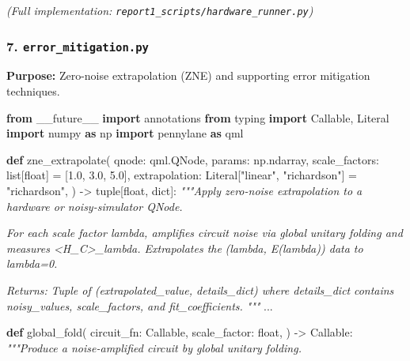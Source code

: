 \documentclass[
  11pt,
]{report}
\newenvironment{Shaded}{}{}
\newcommand{\BuiltInTok}[1]{\textcolor[rgb]{0.00,0.50,0.00}{#1}}
\newcommand{\CommentTok}[1]{\textcolor[rgb]{0.38,0.63,0.69}{\textit{#1}}}
\newcommand{\FloatTok}[1]{\textcolor[rgb]{0.25,0.63,0.44}{#1}}
\newcommand{\ImportTok}[1]{\textcolor[rgb]{0.00,0.50,0.00}{\textbf{#1}}}
\newcommand{\KeywordTok}[1]{\textcolor[rgb]{0.00,0.44,0.13}{\textbf{#1}}}
\newcommand{\NormalTok}[1]{#1}
\newcommand{\OperatorTok}[1]{\textcolor[rgb]{0.40,0.40,0.40}{#1}}
\newcommand{\StringTok}[1]{\textcolor[rgb]{0.25,0.44,0.63}{#1}}
\begin{document}
\emph{(Full implementation:
\texttt{report1\_scripts/hardware\_runner.py})}

\subsubsection{\texorpdfstring{7.
\texttt{error\_mitigation.py}}{7. error\_mitigation.py}}\label{error_mitigation.py}

\textbf{Purpose:} Zero-noise extrapolation (ZNE) and supporting error
mitigation techniques.

\begin{Shaded}
\begin{Highlighting}[]
\ImportTok{from}\NormalTok{ \_\_future\_\_ }\ImportTok{import}\NormalTok{ annotations}
\ImportTok{from}\NormalTok{ typing }\ImportTok{import}\NormalTok{ Callable, Literal}
\ImportTok{import}\NormalTok{ numpy }\ImportTok{as}\NormalTok{ np}
\ImportTok{import}\NormalTok{ pennylane }\ImportTok{as}\NormalTok{ qml}


\KeywordTok{def}\NormalTok{ zne\_extrapolate(}
\NormalTok{    qnode: qml.QNode,}
\NormalTok{    params: np.ndarray,}
\NormalTok{    scale\_factors: }\BuiltInTok{list}\NormalTok{[}\BuiltInTok{float}\NormalTok{] }\OperatorTok{=}\NormalTok{ [}\FloatTok{1.0}\NormalTok{, }\FloatTok{3.0}\NormalTok{, }\FloatTok{5.0}\NormalTok{],}
\NormalTok{    extrapolation: Literal[}\StringTok{"linear"}\NormalTok{, }\StringTok{"richardson"}\NormalTok{] }\OperatorTok{=} \StringTok{"richardson"}\NormalTok{,}
\NormalTok{) }\OperatorTok{{-}\textgreater{}} \BuiltInTok{tuple}\NormalTok{[}\BuiltInTok{float}\NormalTok{, }\BuiltInTok{dict}\NormalTok{]:}
    \CommentTok{"""Apply zero{-}noise extrapolation to a hardware or noisy{-}simulator QNode.}

\CommentTok{    For each scale factor lambda, amplifies circuit noise via global}
\CommentTok{    unitary folding and measures \textless{}H\_C\textgreater{}\_lambda. Extrapolates the}
\CommentTok{    (lambda, E(lambda)) data to lambda=0.}

\CommentTok{    Returns:}
\CommentTok{        Tuple of (extrapolated\_value, details\_dict) where details\_dict}
\CommentTok{        contains \textquotesingle{}noisy\_values\textquotesingle{}, \textquotesingle{}scale\_factors\textquotesingle{}, and \textquotesingle{}fit\_coefficients\textquotesingle{}.}
\CommentTok{    """}
\NormalTok{    ...}


\KeywordTok{def}\NormalTok{ global\_fold(}
\NormalTok{    circuit\_fn: Callable,}
\NormalTok{    scale\_factor: }\BuiltInTok{float}\NormalTok{,}
\NormalTok{) }\OperatorTok{{-}\textgreater{}}\NormalTok{ Callable:}
    \CommentTok{"""Produce a noise{-}amplified circuit by global unitary folding.}


\end{Highlighting}
\end{Shaded}
\end{document}
